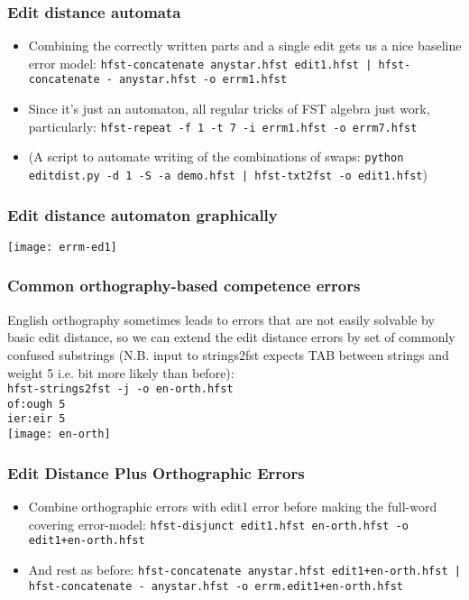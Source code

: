 \documentclass[t,12pt]{beamer}
\begin{document}
\begin{frame}
    \frametitle{Edit distance automata}
    \begin{itemize}
        \item Combining the correctly written parts and a single edit gets us
            a nice baseline error model: 
            \texttt{hfst-concatenate anystar.hfst edit1.hfst | 
            hfst-concatenate - anystar.hfst -o errm1.hfst}
        \item Since it's just an automaton, all regular tricks of FST algebra
            just work, particularly:
            \texttt{hfst-repeat -f 1 -t 7 -i errm1.hfst -o errm7.hfst}
        \item (A script to automate writing of the combinations of swaps:
            \texttt{python editdist.py -d 1 -S -a demo.hfst |
            hfst-txt2fst -o edit1.hfst})
    \end{itemize}
\end{frame}

\begin{frame}
    \frametitle{Edit distance automaton graphically}
    \texttt{[image: errm-ed1]}
\end{frame}

\begin{frame}
    \frametitle{Common orthography-based competence errors}
    English orthography sometimes leads to errors that are not
    easily solvable by basic edit distance, so we can extend the
    edit distance errors by set of commonly confused substrings (N.B.
    input to strings2fst expects TAB between strings and weight 5 i.e.
    bit more likely than before):\\
    \texttt{hfst-strings2fst -j -o en-orth.hfst\\
    of:ough	5\\
    ier:eir	5}\\
    \texttt{[image: en-orth]}
\end{frame}

\begin{frame}
    \frametitle{Edit Distance Plus Orthographic Errors}
    \begin{itemize}
        \item Combine orthographic errors with edit1 error before making the
            full-word covering error-model:
            \texttt{hfst-disjunct edit1.hfst en-orth.hfst -o edit1+en-orth.hfst}
        \item And rest as before: 
            \texttt{hfst-concatenate anystar.hfst edit1+en-orth.hfst | 
            hfst-concatenate - anystar.hfst -o errm.edit1+en-orth.hfst}
    \end{itemize}
\end{frame}
\end{document}
